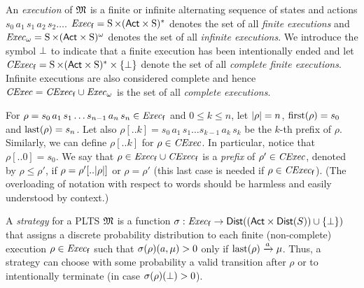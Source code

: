 
An \emph{execution} of ${\mathfrak{M}}$ is a finite or infinite alternating
sequence of states and actions $s_0\, a_1\, s_1\, a_2\, s_2\ldots$.
$\mathit{Exec}_{\mathsf{f}}= \operatorname{S}\times({\rm \sf Act}\times\operatorname{S})^*$ denotes the set of all
\emph{finite executions} and $\mathit{Exec}_\omega= \operatorname{S}\times({\rm \sf Act}\times\operatorname{S})^\omega$
denotes the set of all \emph{infinite executions}.
%
We introduce the symbol $\bot$ to indicate that a finite
execution has been intentionally ended and let $\mathit{CExec}_{\mathsf{f}}=
\operatorname{S}\times({\rm \sf Act}\times\operatorname{S})^*\times\{\bot\}$ denote the set of all
\emph{complete finite executions}.  Infinite executions are also
considered complete and hence $\mathit{CExec}=\mathit{CExec}_{\mathsf{f}}\cup\mathit{Exec}_\omega$ is the
set of all \emph{complete executions}.

For $\rho = s_0\, a_1\, s_1\ldots s_{n-1}\, a_n\, s_n \in \mathit{Exec}_{\mathsf{f}}$ and
$0\leq k\leq n$, let ${|}{\rho}{|}=n$, $\mathrm{first}(\rho)=s_0$ and
$\mathrm{last}(\rho)=s_n$.
%
Let also $\rho[..k] = s_0\, a_1\, s_1\ldots s_{k-1}\, a_k\, s_k$ be
the $k$-th prefix of $\rho$.
%
Similarly, we can define $\rho[..k]$ for $\rho\in\mathit{CExec}$.
In particular, notice that $\rho[..0]=s_0$.
%
We say that $\rho \in \mathit{Exec}_{\mathsf{f}}\cup\mathit{CExec}_{\mathsf{f}}$ is a \emph{prefix} of $\rho' \in \mathit{CExec}$,
denoted by $\rho\leq\rho'$, if $\rho=\rho'[..{|}{\rho}{|}]$ or $\rho=\rho'$
(this last case is needed if $\rho\in\mathit{CExec}_{\mathsf{f}}$).
%
(The overloading of notation with respect to words should be harmless
and easily understood by context.)

A \emph{strategy} for a PLTS ${\mathfrak{M}}$ is a function $\sigma:
\mathit{Exec}_{\mathsf{f}} \to \mathsf{Dist}(({\rm \sf Act}\times\mathsf{Dist}(S))\cup\{\bot\})$ that assigns
a discrete probability distribution to each finite (non-complete)
execution $\rho\in\mathit{Exec}_{\mathsf{f}}$ such that $\sigma(\rho)(a,\mu) > 0$ only
if $\mathrm{last}(\rho)\xrightarrow{a}\mu$.  Thus, a strategy can choose with some
probability a valid transition after $\rho$ or to intentionally
terminate (in case $\sigma(\rho)(\bot)>0$).


